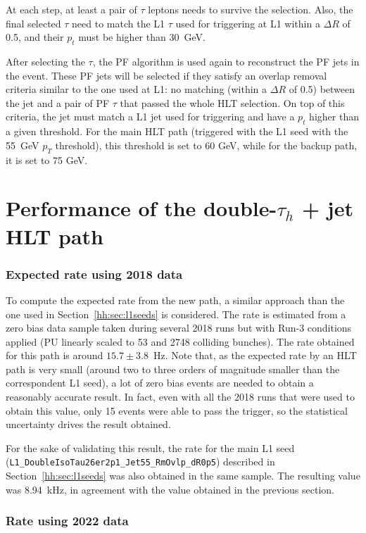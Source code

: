 \documentclass[../main.tex]{subfiles}
\begin{document}
At each step, at least a pair of $\tau$ leptons needs to survive the selection. Also, the final selected $\tau$ need to match the L1 $\tau$ used for triggering at L1 within a $\Delta R$ of 0.5, and their $p_t$ must be higher than 30~GeV.

After selecting the $\tau$, the PF algorithm is used again to reconstruct the PF jets in the event. These PF jets will be selected if they satisfy an overlap removal criteria similar to the one used at L1: no matching (within a $\Delta R$ of 0.5) between the jet and a pair of PF $\tau$ that passed the whole HLT selection. On top of this criteria, the jet must match a L1 jet used for triggering and have a $p_t$ higher than a given threshold. For the main HLT path (triggered with the L1 seed with the 55~GeV $p_T$ threshold), this threshold is set to 60 GeV, while for the backup path, it is set to 75 GeV.

\section{Performance of the double-$\tau_h$ + jet HLT path}

\subsubsection{Expected rate using 2018 data}

To compute the expected rate from the new path, a similar approach than the one used in Section~\ref{hh:sec:l1seeds} is considered. The rate is estimated from a zero bias data sample taken during several 2018 runs but with Run-3 conditions applied (PU linearly scaled to 53 and 2748 colliding bunches). The rate obtained for this path is around $15.7\pm3.8$~Hz. Note that, as the expected rate by an HLT path is very small (around two to three orders of magnitude smaller than the correspondent L1 seed), a lot of zero bias events are needed to obtain a reasonably accurate result. In fact, even with all the 2018 runs that were used to obtain this value, only 15 events were able to pass the trigger, so the statistical uncertainty drives the result obtained.

For the sake of validating this result, the rate for the main L1 seed (\texttt{L1\_Double\-IsoTau26er2p1\_Jet55\_RmOvlp\_dR0p5}) described in Section~\ref{hh:sec:l1seeds} was also obtained in the same sample. The resulting value was 8.94~kHz, in agreement with the value obtained in the previous section. 

\subsubsection{Rate using 2022 data}
\end{document}
